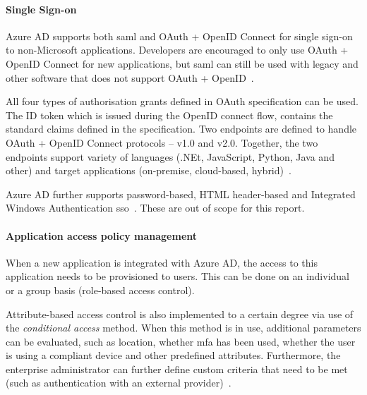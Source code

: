 
\paragraph{Single Sign-on} Azure AD supports both \acrshort{saml} and OAuth + OpenID Connect for single sign-on to non-Microsoft applications. Developers are encouraged to only use OAuth + OpenID Connect for new applications, but \acrshort{saml} can still be used with legacy and other software that does not support OAuth + OpenID~\cite{barbkess2019SingleDirectory}. 

All four types of authorisation grants defined in OAuth specification can be used. The ID token which is issued during the OpenID connect flow, contains the standard claims defined in the specification. Two endpoints are defined to handle OAuth + OpenID Connect protocols -- v1.0 and v2.0. Together, the two endpoints support variety of languages (.NEt, JavaScript, Python, Java and other) and target applications (on-premise, cloud-based, hybrid)~\cite{deGuzman2018AboutPlatform}.

Azure AD further supports password-based, HTML header-based  and Integrated Windows Authentication \acrlong{sso}~\cite{barbkess2019SingleDirectory}. These are out of scope for this report.

\paragraph{Application access policy management} When a new application is integrated with Azure AD, the access to this application needs to be provisioned to users. This can be done on an individual or a group basis (role-based access control). 

Attribute-based access control is also implemented to a certain degree via use of the \textit{conditional access} method. When this method is in use, additional parameters can be evaluated, such as location, whether \acrshort{mfa} has been used, whether the user is using a compliant device and other predefined attributes. Furthermore, the enterprise administrator can further define custom criteria that need to be met (such as authentication with an external provider)~\cite{Vilcinskas2019WhatAccess}.